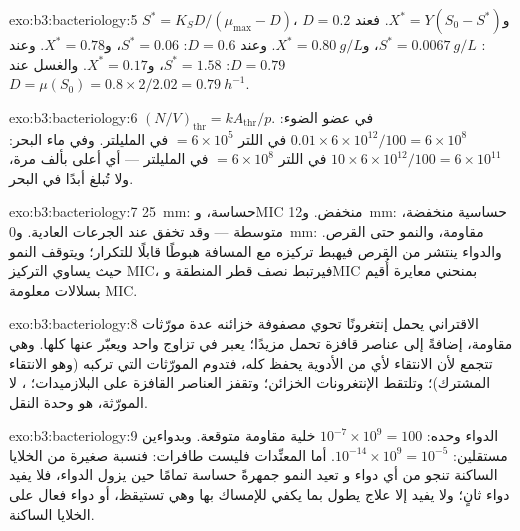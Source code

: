 \begin{solution}{exo:b3:bacteriology:5}
$S^{*} = K_{S}D/(\mu_{\max} - D)$، و$X^{*} = Y(S_{0} - S^{*})$. فعند $D = 0.2$:
$S^{*} = \qty{0.0067}{g/L}$، و$X^{*} = \qty{0.80}{g/L}$. وعند $D = 0.6$:
$S^{*} = 0.06$، و$X^{*} = 0.78$. وعند $D = 0.79$: $S^{*} = 1.58$، و$X^{*} = 0.17$.
والغسل عند $D = \mu(S_{0}) = 0.8\times 2/2.02 = \qty{0.79}{h^{-1}}$.
\end{solution}

\begin{solution}{exo:b3:bacteriology:6}
$(N/V)_{\text{thr}} = kA_{\text{thr}}/p$. في عضو الضوء: $0.01\times
6\times 10^{12}/100 = 6\times 10^{8}$ في اللتر $= 6\times 10^{5}$ في
المليلتر. وفي ماء البحر: $10\times 6\times 10^{12}/100 = 6\times 10^{11}$ في اللتر
$= 6\times 10^{8}$ في المليلتر --- أي أعلى بألف مرة، ولا تُبلغ أبدًا في
البحر.
\end{solution}

\begin{solution}{exo:b3:bacteriology:7}
\qty{25}{mm}: حساسة، وMIC منخفض. و\qty{12}{mm}: حساسية منخفضة،
متوسطة --- وقد تخفق عند الجرعات العادية. و\qty{0}{mm}: مقاومة،
والنمو حتى القرص. والدواء ينتشر من القرص فيهبط
تركيزه مع المسافة هبوطًا قابلًا للتكرار؛ ويتوقف النمو
حيث يساوي التركيز MIC، فيرتبط نصف قطر المنطقة وMIC
بمنحني معايرة أُقيم بسلالات معلومة MIC.
\end{solution}

\begin{solution}{exo:b3:bacteriology:8}
 الاقتراني يحمل إنتغرونًا تحوي مصفوفة خزائنه
عدة مورّثات مقاومة، إضافةً إلى عناصر قافزة تحمل مزيدًا؛ 
يعبر في تزاوج واحد ويعبّر عنها كلها. وهي تتجمع لأن
الانتقاء لأي من الأدوية يحفظ  كله، فتدوم
المورّثات التي تركبه (وهو الانتقاء المشترك)؛ وتلتقط الإنتغرونات
الخزائن؛ وتقفز العناصر القافزة على البلازميدات؛ ، لا
المورّثة، هو وحدة النقل.
\end{solution}

\begin{solution}{exo:b3:bacteriology:9}
الدواء وحده: $10^{-7}\times 10^{9} = 100$ خلية مقاومة متوقعة. وبدواءين
مستقلين: $10^{-14}\times 10^{9} = 10^{-5}$. أما المعنِّدات فليست
طافرات: فنسبة صغيرة من الخلايا الساكنة تنجو من أي دواء و
تعيد النمو جمهرةً حساسة تمامًا حين يزول الدواء، فلا يفيد دواء
ثانٍ؛ ولا يفيد إلا علاج يطول بما يكفي للإمساك بها وهي
تستيقظ، أو دواء فعال على الخلايا الساكنة.
\end{solution}

